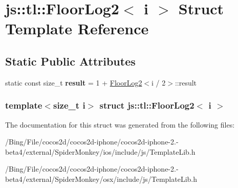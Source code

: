 \hypertarget{structjs_1_1tl_1_1_floor_log2}{\section{js\-:\-:tl\-:\-:Floor\-Log2$<$ i $>$ Struct Template Reference}
\label{structjs_1_1tl_1_1_floor_log2}
}
\subsection*{Static Public Attributes}
\begin{DoxyCompactItemize}
\item 
\hypertarget{structjs_1_1tl_1_1_floor_log2_a16caf8f5546d7acdb3549f493d9825e0}{static const size\-\_\-t {\bfseries result} = 1 + \hyperlink{structjs_1_1tl_1_1_floor_log2}{Floor\-Log2}$<$i / 2$>$\-::result}\label{structjs_1_1tl_1_1_floor_log2_a16caf8f5546d7acdb3549f493d9825e0}

\end{DoxyCompactItemize}
\subsubsection*{template$<$size\-\_\-t i$>$ struct js\-::tl\-::\-Floor\-Log2$<$ i $>$}



The documentation for this struct was generated from the following files\-:\begin{DoxyCompactItemize}
\item 
/\-Bing/\-File/cocos2d/cocos2d-\/iphone/cocos2d-\/iphone-\/2.-\/beta4/external/\-Spider\-Monkey/ios/include/js/Template\-Lib.\-h\item 
/\-Bing/\-File/cocos2d/cocos2d-\/iphone/cocos2d-\/iphone-\/2.-\/beta4/external/\-Spider\-Monkey/osx/include/js/Template\-Lib.\-h\end{DoxyCompactItemize}
